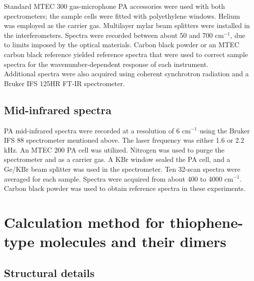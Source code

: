 	Standard MTEC 300 gas-microphone PA accessories were used with both spectrometers; the sample cells were fitted with polyethylene windows. Helium was employed as the carrier gas. Multilayer mylar beam splitters were installed in the interferometers. Spectra were recorded between about 50 and 700 cm$^{-1}$, due to limits imposed by the optical materials. Carbon black powder or an MTEC carbon black reference yielded reference spectra that were used to correct sample spectra for the wavenumber-dependent response of each instrument.\\
	
	Additional spectra were also acquired using coherent synchrotron radiation and a Bruker IFS 125HR FT-IR spectrometer.
	
	\subsection{Mid-infrared spectra}
	
	\bigskip
	
	PA mid-infrared spectra were recorded at a resolution of 6 cm$^{-1}$ using the Bruker IFS 88 spectrometer mentioned above. The laser frequency was either 1.6 or 2.2 kHz. An MTEC 200 PA cell was utilized. Nitrogen was used to purge the spectrometer and as a carrier gas. A KBr window sealed the PA cell, and a Ge/KBr beam splitter was used in the spectrometer. Ten 32-scan spectra were averaged for each sample. Spectra were acquired from about 400 to 4000 cm$^{-1}$. Carbon black powder was used to obtain reference spectra in these experiments.
	
	
	\section{Calculation method for thiophene-type molecules and their dimers}
	
	\bigskip
	
	\subsection{Structural details }
	
